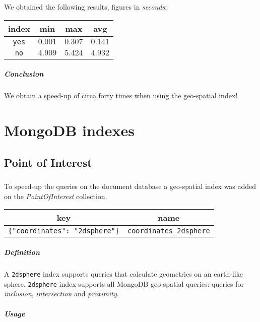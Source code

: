 

We obtained the following results, figures in \textit{seconds}:

\begin{tabular}{|c|c|c|c|}
	\hline
	index & min & max & avg \\
	\hline
	\hline
	\texttt{yes} & $0.001$ & $0.307$ & $0.141$  \\
	\hline
	\texttt{no} & $4.909$ & $5.424$ & $4.932$  \\
	\hline
\end{tabular}

\paragraph{Conclusion}
We obtain a speed-up of circa forty times when using the geo-spatial index!

\chapter{MongoDB indexes}

\section{Point of Interest}

\paragraph{}
To speed-up the queries on the document database a geo-spatial index was added
on the \textit{PointOfInterest} collection.

\begin{tabular}{|c|c|}
	\hline
	key & name \\
	\hline
	\texttt{\{"coordinates": "2dsphere"\}} & \texttt{coordinates\_2dsphere}
	\\
	\hline
\end{tabular}

\paragraph{Definition}
A \texttt{2dsphere} index supports queries that calculate geometries on an
earth-like sphere. \texttt{2dsphere} index supports all MongoDB geo-spatial
queries: queries for \textit{inclusion}, \textit{intersection} and
\textit{proximity}.

\paragraph{Usage}

